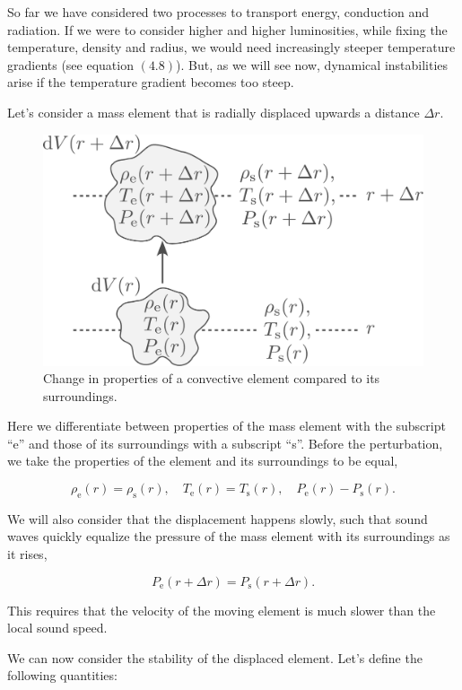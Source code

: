 \documentclass[twocolumn]{article}
\begin{document}
So far we have considered two processes to transport energy, conduction
and radiation. If we were to consider higher and higher luminosities,
while fixing the temperature, density and radius, we would need
increasingly steeper temperature gradients (see equation \((4.8)\)).
But, as we will see now, dynamical instabilities arise if the
temperature gradient becomes too steep.

Let's consider a mass element that is radially displaced upwards a
distance \(\Delta r\).

\begin{figure}
\centering
\includegraphics{../assets/6_convection/convection.pdf}
\caption{Change in properties of a convective element compared to its
surroundings.}
\end{figure}

Here we differentiate between properties of the mass element with the
subscript ``e'' and those of its surroundings with a subscript ``s''.
Before the perturbation, we take the properties of the element and its
surroundings to be equal,

\[\rho_\mathrm{e}(r)=\rho_\mathrm{s}(r),\quad T_\mathrm{e}(r)=T_\mathrm{s}(r),\quad P_\mathrm{e}(r)-P_\mathrm{s}(r).\]

We will also consider that the displacement happens slowly, such that
sound waves quickly equalize the pressure of the mass element with its
surroundings as it rises,

\[P_\mathrm{e}(r+\Delta r) = P_\mathrm{s}(r+\Delta r).\]

This requires that the velocity of the moving element is much slower
than the local sound speed.

We can now consider the stability of the displaced element. Let's define
the following quantities:
\end{document}
